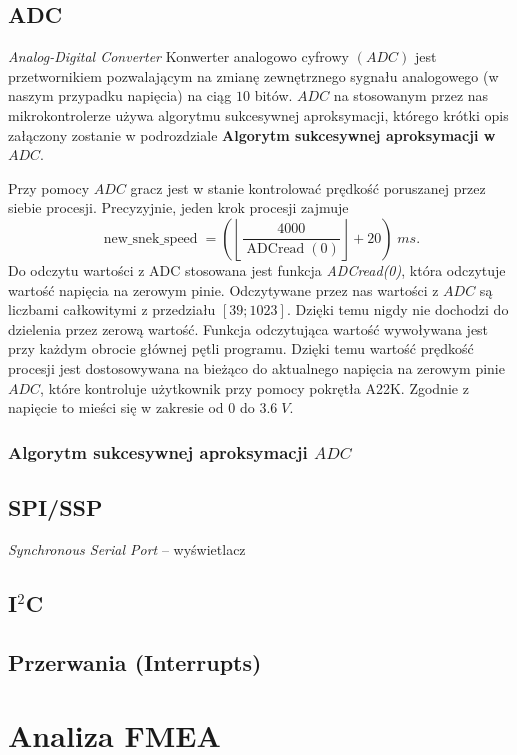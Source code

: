\documentclass[a4paper,12pt,twoside]{article}
\theoremstyle{plain}
\theoremstyle{definition}
\theoremstyle{remark}
\begin{document}
\subsection{ADC}
\textit{Analog-Digital Converter}
Konwerter analogowo cyfrowy $(ADC)$ jest przetwornikiem pozwalającym na zmianę zewnętrznego sygnału analogowego (w naszym przypadku napięcia) na ciąg $10$ bitów. $ADC$ na stosowanym przez nas mikrokontrolerze używa algorytmu sukcesywnej aproksymacji, którego krótki opis załączony zostanie w podrozdziale \textbf{Algorytm sukcesywnej aproksymacji w $ADC$}.

Przy pomocy $ADC$ gracz jest w stanie kontrolować prędkość poruszanej przez siebie procesji. Precyzyjnie, jeden krok procesji zajmuje
\[
\operatorname{new\_snek\_speed} =\left( \left\lfloor \frac{4000}{ \operatorname{ADCread}(0)} \right\rfloor + 20 \right) \; ms.
\]
Do odczytu wartości z ADC stosowana jest funkcja \textit{ADCread(0)}, która odczytuje wartość napięcia na zerowym pinie.
Odczytywane przez nas wartości z $ADC$ są liczbami całkowitymi z przedziału $[39;1023]$. Dzięki temu nigdy nie dochodzi do dzielenia przez zerową wartość. Funkcja odczytująca wartość wywoływana jest przy każdym obrocie głównej pętli programu. Dzięki temu wartość prędkość procesji jest dostosowywana na bieżąco do aktualnego napięcia na zerowym pinie $ADC$, które kontroluje użytkownik przy pomocy pokrętła A22K. Zgodnie z \cite{instrukcja} napięcie to mieści się w zakresie od $0$ do $3.6 \;V$. 

	\subsubsection{Algorytm sukcesywnej aproksymacji $ADC$}

\subsection{SPI/SSP}
\textit{Synchronous Serial Port} -- wyświetlacz

\subsection{I$^2$C}

\subsection{Przerwania (Interrupts)}

\section{Analiza FMEA}
\end{document}

